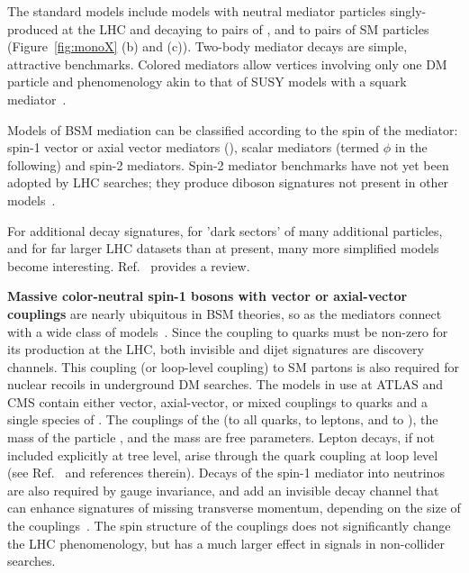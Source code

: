 The standard models include models with neutral mediator particles singly-produced at the LHC and decaying to pairs of \IP, and to pairs of SM particles (Figure~\ref{fig:monoX} (b) and (c)). Two-body mediator decays are simple, attractive benchmarks. Colored mediators allow vertices involving only one DM particle and phenomenology akin to that of SUSY models with a squark mediator~\cite{Papucci:2014iwa,An:2013xka,Bell:2012rg}. 

Models of BSM mediation can be classified according to the spin of the mediator: spin-1 vector or axial vector mediators (\Zprime), scalar mediators (termed $\phi$ in the following) and spin-2 mediators. Spin-2 mediator benchmarks have not yet been adopted by LHC searches; they produce diboson signatures not present in other models~\cite{Kraml:2017atm,Han:2015cty}.

For additional decay signatures, for 'dark sectors' of many additional particles, and for far larger LHC datasets than at present, many more simplified models become interesting. Ref.~\cite{Arcadi:2017kky} provides a review. %



\textbf{Massive color-neutral spin-1 bosons with vector or axial-vector couplings} are nearly ubiquitous in BSM theories, so \Zprime as the mediators connect with a wide class of models~\cite{Shoemaker:2011vi}.
Since the \Zprime coupling to quarks must be non-zero for its production at the LHC, both invisible and dijet signatures are discovery channels.
This coupling (or loop-level coupling) to SM partons is also required for nuclear recoils in underground DM searches.
The models in use at ATLAS and CMS contain either vector, axial-vector, or mixed couplings to quarks and a single species of \IP.
The couplings of the \Zprime (\gq to all quarks, \gl to leptons, and \gDM to \IP), the mass of the \IP particle \mdm, and the \Zprime mass \mmed are free parameters.
Lepton decays, if not included explicitly at tree level, arise through the quark coupling at loop level (see Ref.~\cite{Albert:2017onk} and references therein). Decays of the spin-1 mediator into neutrinos are also required by gauge invariance, and add an invisible decay channel that can enhance signatures of missing transverse momentum, depending on the size of the couplings~\cite{Albert:2017onk}. 
The spin structure of the \Zprime couplings does not significantly change the LHC phenomenology, but has a much larger effect in signals in non-collider searches. 

